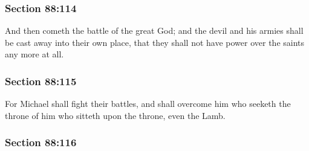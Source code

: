 
	\subsubsection{Section 88:114} %
		\label{DC88-114}

		And then cometh the battle of the great God; and the devil and his armies shall be cast away into their own place, that they shall not have power over the saints any more at all.


	\subsubsection{Section 88:115} %
		\label{DC88-115}

		For Michael shall fight their battles, and shall overcome him who seeketh the throne of him who sitteth upon the throne, even the Lamb.


	\subsubsection{Section 88:116} %
		\label{DC88-116}

